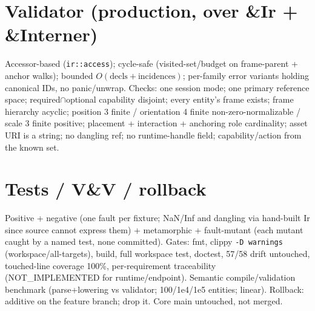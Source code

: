 \documentclass[11pt]{article}
\begin{document}
\section*{Validator (production, over \&Ir + \&Interner)}
Accessor-based (\texttt{ir::access}); cycle-safe (visited-set/budget on frame-parent + anchor walks);
bounded $O(\text{decls}+\text{incidences})$; per-family error variants holding canonical IDs, no
panic/unwrap. Checks: one session mode; one primary reference space; required$\cap$optional capability
disjoint; every entity's frame exists; frame hierarchy acyclic; position 3 finite / orientation 4 finite
non-zero-normalizable / scale 3 finite positive; placement + interaction + anchoring role cardinality;
asset URI is a string; no dangling ref; no runtime-handle field; capability/action from the known set.
\section*{Tests / V\&V / rollback}
Positive + negative (one fault per fixture; NaN/Inf and dangling via hand-built Ir since source cannot
express them) + metamorphic + fault-mutant (each mutant caught by a named test, none committed). Gates:
fmt, clippy \texttt{-D warnings} (workspace/all-targets), build, full workspace test, doctest, 57/58 drift
untouched, touched-line coverage 100\%, per-requirement traceability (NOT\_IMPLEMENTED for runtime/endpoint).
Semantic compile/validation benchmark (parse+lowering vs validator; 100/1e4/1e5 entities; linear).
Rollback: additive on the feature branch; drop it. Core main untouched, not merged.
\end{document}
